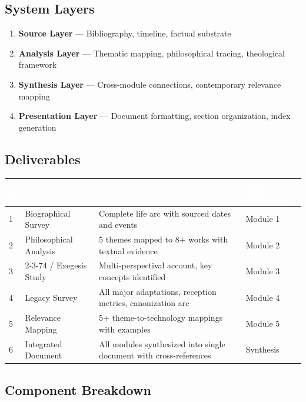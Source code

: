 \documentclass[11pt,letterpaper]{article}
\newcommand{\tableheader}[1]{\textbf{\sffamily\textcolor{white}{#1}}}
\begin{document}
\subsection{System Layers}

\begin{enumerate}[leftmargin=2em]
\item \textbf{Source Layer} --- Bibliography, timeline, factual substrate
\item \textbf{Analysis Layer} --- Thematic mapping, philosophical tracing, theological framework
\item \textbf{Synthesis Layer} --- Cross-module connections, contemporary relevance mapping
\item \textbf{Presentation Layer} --- Document formatting, section organization, index generation
\end{enumerate}

\subsection{Deliverables}

\begin{center}
\begin{tabularx}{\textwidth}{C{0.5cm}L{3.5cm}XL{2.5cm}}
\toprule
{}
\tableheader{\#} & \tableheader{Deliverable} & \tableheader{Acceptance Criteria} & \tableheader{Spec Reference} \\
 & Biographical Survey & Complete life arc with sourced dates and events & Module 1 \\
2 & Philosophical Analysis & 5 themes mapped to 8+ works with textual evidence & Module 2 \\
3 & 2-3-74 / Exegesis Study & Multi-perspectival account, key concepts identified & Module 3 \\
4 & Legacy Survey & All major adaptations, reception metrics, canonization arc & Module 4 \\
5 & Relevance Mapping & 5+ theme-to-technology mappings with examples & Module 5 \\
6 & Integrated Document & All modules synthesized into single document with cross-references & Synthesis \\
\bottomrule
\end{tabularx}
\end{center}

\subsection{Component Breakdown}
\end{document}
